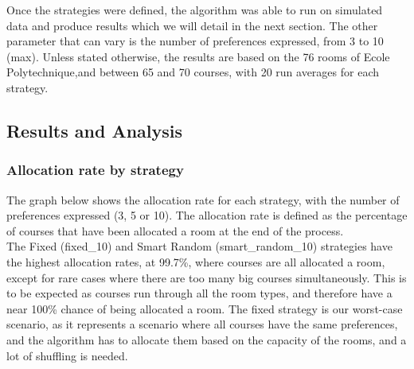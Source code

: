 \documentclass[a4paper, oneside]{article}
\theoremstyle{plain}
\begin{document}
Once the strategies were defined, the algorithm was able to run on simulated data and produce results which we will detail in the next section. The other parameter that can vary is the number of preferences
expressed, from 3 to 10 (max). Unless stated otherwise, the results are based on the 76 rooms of Ecole Polytechnique,and between 65 and 70 courses, with 20 run averages for each strategy.

\subsection{Results and Analysis}

\subsubsection*{Allocation rate by strategy}

The graph below shows the allocation rate for each strategy, with the number of preferences expressed (3, 5 or 10). The allocation rate is defined as the percentage of courses that have been
allocated a room at the end of the process.\\

The Fixed (fixed\_10) and Smart Random (smart\_random\_10) strategies have the highest allocation rates, at 99.7\%, where courses are all allocated a room, except for rare cases where there are
too many big courses simultaneously. This is to be expected as courses run through all the room types, and therefore have a near 100\% chance of being allocated a room. The fixed strategy is our
worst-case scenario, as it represents a scenario where all courses have the same preferences, and the algorithm has to allocate them based on the capacity of the rooms, and a lot of shuffling is needed.
\end{document}
